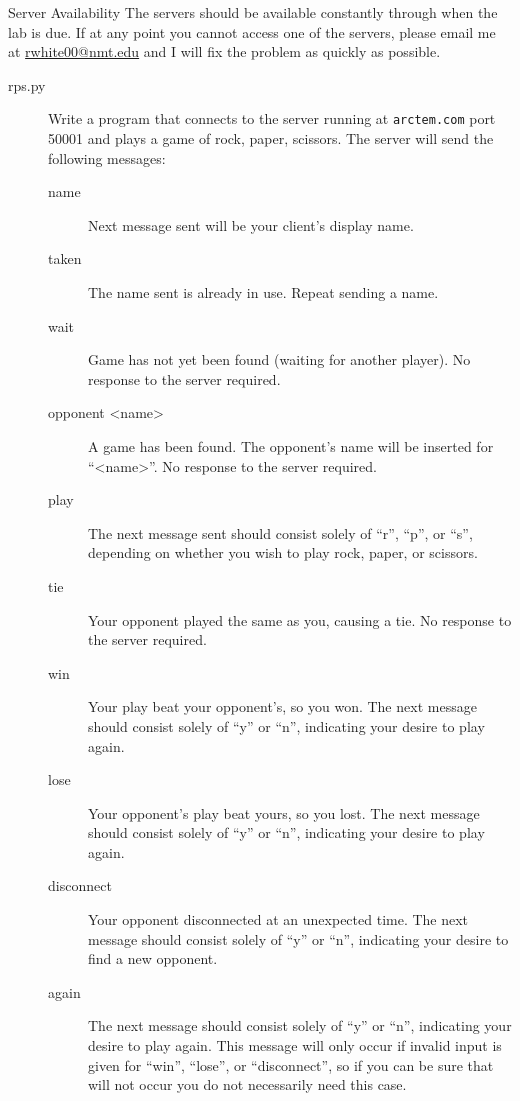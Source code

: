 \documentclass[11pt]{cselabheader}
\begin{document}
\begin{warningbox}{Server Availability}
  The servers should be available constantly through when the lab is due. If at
  any point you cannot access one of the servers, please email me at
  \href{mailto:rwhite00@nmt.edu}{rwhite00@nmt.edu} and I will fix the problem
  as quickly as possible.
\end{warningbox}

\begin{description}
\item[rps.py] Write a program that connects to the server running at
  \lstinline{arctem.com} port 50001 and plays a game of rock, paper, scissors. The server
  will send the following messages:

  \begin{description}
    \item[name] Next message sent will be your client's display name.
    \item[taken] The name sent is already in use. Repeat sending a name.
    \item[wait] Game has not yet been found (waiting for another player). No
      response to the server required.
    \item[opponent <name>] A game has been found. The opponent's name will be
      inserted for ``<name>''. No response to the server required.
    \item[play] The next message sent should consist solely of ``r'', ``p'', or
      ``s'', depending on whether you wish to play rock, paper, or scissors.
    \item[tie] Your opponent played the same as you, causing a tie. No response
      to the server required.
    \item[win] Your play beat your opponent's, so you won. The next
      message should consist solely of ``y'' or ``n'', indicating your desire to
      play again.
    \item[lose] Your opponent's play beat yours, so you lost. The next message
      should consist solely of ``y'' or ``n'', indicating your desire to play
      again.  
    \item[disconnect] Your opponent disconnected at an unexpected time.  The
      next message should consist solely of ``y'' or ``n'', indicating your
      desire to find a new opponent.
    \item[again] The next message should consist solely of ``y'' or ``n'',
      indicating your desire to play again. This message will only occur if
      invalid input is given for ``win'', ``lose'', or ``disconnect'', so if
      you can be sure that will not occur you do not necessarily need this
      case.
  \end{description}


\end{description}
\end{document}
